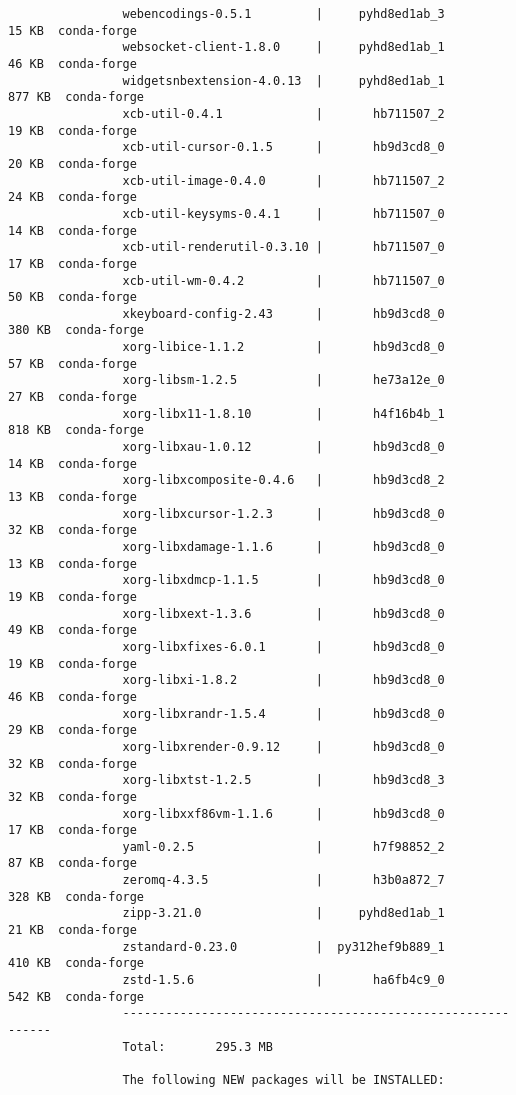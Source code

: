 \documentclass{article}
\begin{document}
\begin{itemize}
\begin{itemize}
\begin{itemize}
\begin{verbatim}
				webencodings-0.5.1         |     pyhd8ed1ab_3          15 KB  conda-forge
				websocket-client-1.8.0     |     pyhd8ed1ab_1          46 KB  conda-forge
				widgetsnbextension-4.0.13  |     pyhd8ed1ab_1         877 KB  conda-forge
				xcb-util-0.4.1             |       hb711507_2          19 KB  conda-forge
				xcb-util-cursor-0.1.5      |       hb9d3cd8_0          20 KB  conda-forge
				xcb-util-image-0.4.0       |       hb711507_2          24 KB  conda-forge
				xcb-util-keysyms-0.4.1     |       hb711507_0          14 KB  conda-forge
				xcb-util-renderutil-0.3.10 |       hb711507_0          17 KB  conda-forge
				xcb-util-wm-0.4.2          |       hb711507_0          50 KB  conda-forge
				xkeyboard-config-2.43      |       hb9d3cd8_0         380 KB  conda-forge
				xorg-libice-1.1.2          |       hb9d3cd8_0          57 KB  conda-forge
				xorg-libsm-1.2.5           |       he73a12e_0          27 KB  conda-forge
				xorg-libx11-1.8.10         |       h4f16b4b_1         818 KB  conda-forge
				xorg-libxau-1.0.12         |       hb9d3cd8_0          14 KB  conda-forge
				xorg-libxcomposite-0.4.6   |       hb9d3cd8_2          13 KB  conda-forge
				xorg-libxcursor-1.2.3      |       hb9d3cd8_0          32 KB  conda-forge
				xorg-libxdamage-1.1.6      |       hb9d3cd8_0          13 KB  conda-forge
				xorg-libxdmcp-1.1.5        |       hb9d3cd8_0          19 KB  conda-forge
				xorg-libxext-1.3.6         |       hb9d3cd8_0          49 KB  conda-forge
				xorg-libxfixes-6.0.1       |       hb9d3cd8_0          19 KB  conda-forge
				xorg-libxi-1.8.2           |       hb9d3cd8_0          46 KB  conda-forge
				xorg-libxrandr-1.5.4       |       hb9d3cd8_0          29 KB  conda-forge
				xorg-libxrender-0.9.12     |       hb9d3cd8_0          32 KB  conda-forge
				xorg-libxtst-1.2.5         |       hb9d3cd8_3          32 KB  conda-forge
				xorg-libxxf86vm-1.1.6      |       hb9d3cd8_0          17 KB  conda-forge
				yaml-0.2.5                 |       h7f98852_2          87 KB  conda-forge
				zeromq-4.3.5               |       h3b0a872_7         328 KB  conda-forge
				zipp-3.21.0                |     pyhd8ed1ab_1          21 KB  conda-forge
				zstandard-0.23.0           |  py312hef9b889_1         410 KB  conda-forge
				zstd-1.5.6                 |       ha6fb4c9_0         542 KB  conda-forge
				------------------------------------------------------------
				Total:       295.3 MB
				
				The following NEW packages will be INSTALLED:
				

\end{verbatim}
\end{itemize}
\end{itemize}
\end{itemize}
\end{document}
